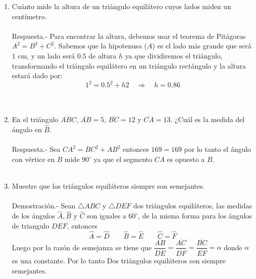 \documentclass[10pt]{article}
\begin{document}
\begin{enumerate}
    
\item Cuánto mide la altura de un triángulo equilátero cuyos lados miden un centímetro.\\\\
    Respuesta.-\; Para encontrar la altura, debemos usar el teorema de Pitágoras $A^2=B^2+C^2$. Sabemos que la hipotenusa ($A$) es el lado más grande que será $1$ cm, y un lado será $0.5$ de altura $h$ ya que dividiremos el triángulo, transformando el triángulo equilátero en un triángulo rectángulo y la altura estará dado por: $$1^2=0.5^2+h2 \quad \Rightarrow \quad h=0.86$$\\\\

\item En el triángulo $ABC$, $\overline{AB} = 5$, $\overline{BC} = 12$ y $\overline{CA} = 13$. ¿Cuál es la medida del ángulo en $\widehat{B}$.\\\\
    Respuesta.-\; Sea $CA^2 = BC^2 + AB^2$ entonces $169=169$ por lo tanto el ángulo con vértice en $B$ mide $90^{\circ}$ ya que el segmento $CA$ es opuesto a $B$.\\\\ 

\item Muestre que los triángulos equiláteros siempre son semejantes.\\\\
    Demostración.-\; Sean $\triangle ABC$ y $\triangle DEF$ dos triángulos equiláteros, las medidas de los ángulos $\widehat{A}, \widehat{B}$ y $\widehat{C}$ son iguales a $60^{\circ}$, de la misma forma para los ángulos de triangulo $DEF$, entonces $$\widehat{A}=\widehat{D} \qquad \widehat{B}=\widehat{E} \qquad \widehat{C}=\widehat{F}$$ Luego por la razón de semejanza se tiene que $\dfrac{\overline{AB}}{\overline{DE}}=\dfrac{\overline{AC}}{\overline{DF}}=\dfrac{\overline{BC}}{\overline{EF}}=\alpha$ donde $\alpha$ es una constante. Por lo tanto Dos triángulos equiláteros son siempre semejantes.\\\\


\end{enumerate}
\end{document}
